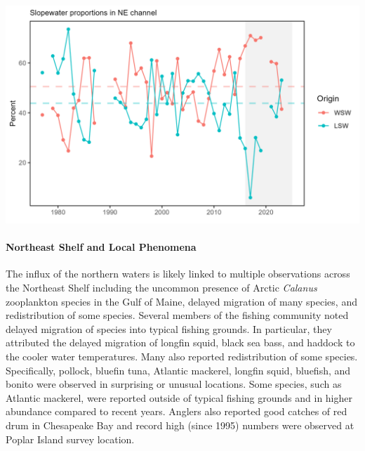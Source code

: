 \documentclass[
  10pt,
]{article}
\let\origfigure\figure
\let\endorigfigure\endfigure
\renewenvironment{figure}[1][2] {
    \expandafter\origfigure\expandafter[H]
} {
    \endorigfigure
}
\begin{document}
\begin{figure}

{\centering \includegraphics[width=6.5in]{images/BothReports/slopewater_BothReports_2025-09-09} 

}

\caption{The proportion of Warm Slope Water (WSW) and Labrador Slope Water (LSW) enter the Gulf of Maine through the Northeast Channel from 1977 to 2023. The orange and teal dashed lines represent the long-term proportion averages for the WSW and LSW respectively.}\label{fig:slopewater}
\end{figure}

\paragraph{Northeast Shelf and Local Phenomena}\label{northeast-shelf-and-local-phenomena}

The influx of the northern waters is likely linked to multiple observations across the Northeast Shelf including the uncommon presence of Arctic \emph{Calanus} zooplankton species in the Gulf of Maine, delayed migration of many species, and redistribution of some species. Several members of the fishing community noted delayed migration of species into typical fishing grounds. In particular, they attributed the delayed migration of longfin squid, black sea bass, and haddock to the cooler water temperatures. Many also reported redistribution of some species. Specifically, pollock, bluefin tuna, Atlantic mackerel, longfin squid, bluefish, and bonito were observed in surprising or unusual locations. Some species, such as Atlantic mackerel, were reported outside of typical fishing grounds and in higher abundance compared to recent years. Anglers also reported good catches of red drum in Chesapeake Bay and record high (since 1995) numbers were observed at Poplar Island survey location.
\end{document}
